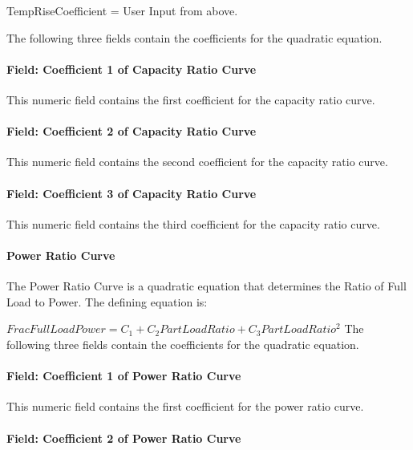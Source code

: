TempRiseCoefficient = User Input from above.

The following three fields contain the coefficients for the quadratic equation.

\paragraph{Field: Coefficient 1 of Capacity Ratio Curve}\label{field-coefficient-1-of-capacity-ratio-curve-1}

This numeric field contains the first coefficient for the capacity ratio curve.

\paragraph{Field: Coefficient 2 of Capacity Ratio Curve}\label{field-coefficient-2-of-capacity-ratio-curve-1}

This numeric field contains the second coefficient for the capacity ratio curve.

\paragraph{Field: Coefficient 3 of Capacity Ratio Curve}\label{field-coefficient-3-of-capacity-ratio-curve-1}

This numeric field contains the third coefficient for the capacity ratio curve.

\paragraph{Power Ratio Curve}\label{power-ratio-curve-1}

The Power Ratio Curve is a quadratic equation that determines the Ratio of Full Load to Power. The defining equation is:

\(FracFullLoadPower = {C_1} + {C_2}PartLoadRatio + {C_3}PartLoadRati{o^2}\) The following three fields contain the coefficients for the quadratic equation.

\paragraph{Field: Coefficient 1 of Power Ratio Curve}\label{field-coefficient-1-of-power-ratio-curve}

This numeric field contains the first coefficient for the power ratio curve.

\paragraph{Field: Coefficient 2 of Power Ratio Curve}\label{field-coefficient-2-of-power-ratio-curve-1}

